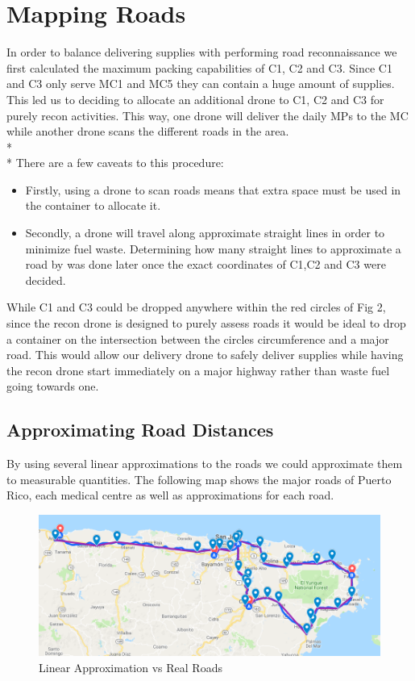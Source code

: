 \documentclass[a4paper,12pt]{article}
\begin{document}
\section{Mapping Roads}
In order to balance delivering supplies with performing road reconnaissance we first calculated the maximum packing capabilities of C1, C2 and C3.
Since C1 and C3 only serve MC1 and MC5 they can contain a huge amount of supplies. This led us to deciding to allocate an additional drone to C1, C2 and C3 for purely recon activities.
This way, one drone will deliver the daily MPs to the MC while another drone scans the different roads in the area.\\*\\*
There are a few caveats to this procedure:
\begin{itemize}
\item Firstly, using a drone to scan roads means that extra space must be used in the container to allocate it.
\item Secondly, a drone will travel along approximate straight lines in order to minimize fuel waste. Determining how many straight lines to approximate a road by was done later once the exact coordinates of C1,C2 and C3 were decided.
\end{itemize}

While C1 and C3 could be dropped anywhere within the red circles of Fig 2, since the recon drone is designed to purely assess roads it would be ideal to drop a container on the intersection between the circles circumference and a major road.
This would allow our delivery drone to safely deliver supplies while having the recon drone start immediately on a major highway rather than waste fuel going towards one.

\subsection{Approximating Road Distances}
By using several linear approximations to the roads we could approximate them to measurable quantities. The following map shows the major roads of Puerto Rico, each medical centre as well as approximations for each road.

\begin{figure}[h]
\centering
\includegraphics[scale =0.5]{ConnectedLineMap}
\caption{Linear Approximation vs Real Roads}
\label{road-approx}
\end{figure}
\end{document}
